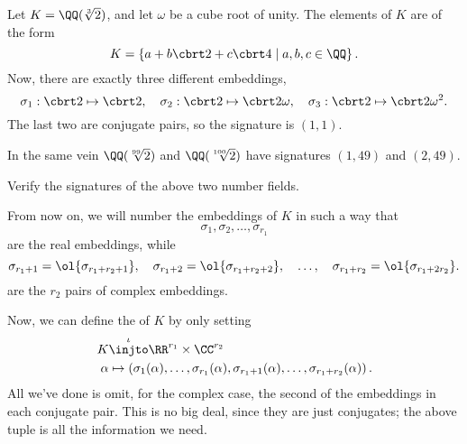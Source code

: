 \begin{example}[Signatures for $K = \QQ(\cbrt{2})$]
	Let $K = \QQ(\sqrt[3]{2})$, and let $\omega$ be a cube root of unity.
	The elements of $K$ are of the form
	\[ K = \left\{ a + b\cbrt2 + c\cbrt4 \mid a,b,c \in \QQ  \right\}. \]
	Now, there are exactly three different embeddings, 
	\[ \sigma_1 : \cbrt 2 \mapsto \cbrt 2,
		\quad
		\sigma_2 : \cbrt 2 \mapsto \cbrt 2 \omega,
		\quad
		\sigma_3 : \cbrt 2 \mapsto \cbrt 2 \omega^2. \]
	The last two are conjugate pairs, so the signature is $(1,1)$.
\end{example}
\begin{example}
	In the same vein $\QQ(\sqrt[99]{2})$ and $\QQ(\sqrt[100]{2})$
	have signatures $(1,49)$ and $(2,49)$.
\end{example}
\begin{ques}
	Verify the signatures of the above two number fields.
\end{ques}

From now on, we will number the embeddings of $K$ in such a way that
\[ \sigma_1, \sigma_2, \dots, \sigma_{r_1}  \]are the real embeddings,
while 
\[
	\sigma_{r_1+1} = \ol{\sigma_{r_1+r_2+1}}, \quad
	\sigma_{r_1+2} = \ol{\sigma_{r_1+r_2+2}}, \quad
	\dots, \quad
	\sigma_{r_1+r_2} = \ol{\sigma_{r_1+2r_2}}.
\]
are the $r_2$ pairs of complex embeddings.

Now, we can define the  of $K$ by only setting
\begin{align*}
K &\overset\iota\injto \RR^{r_1} \times \CC^{r_2} \\
\alpha &\mapsto  \left( \sigma_1(\alpha), \dots, \sigma_{r_1}(\alpha),
\sigma_{r_1+1}(\alpha), \dots, \sigma_{r_1+r_2}(\alpha) \right). 
\end{align*}
All we've done is omit, for the complex case, the second of the embeddings in each conjugate pair.
This is no big deal, since they are just conjugates;
the above tuple is all the information we need.

